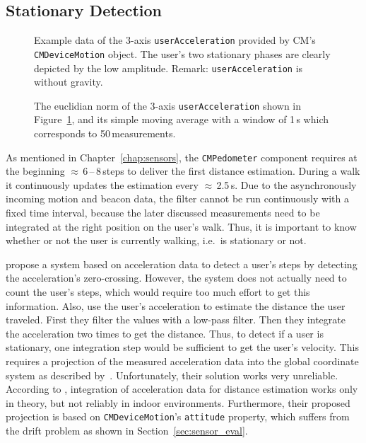 \subsection{Stationary Detection}\label{sec:algo_stationary}

\begin{figure}
	
	\caption{Example data of the 3-axis \texttt{userAcceleration} provided by \acs{CM}'s \texttt{CMDeviceMotion} object. The user's two stationary phases are clearly depicted by the low amplitude. Remark: \texttt{userAcceleration} is without gravity.}
	\label{fig:mm_stationary_1}
\end{figure}

\begin{figure}
	
	\caption{The euclidian norm of the 3-axis \texttt{userAcceleration} shown in Figure~\ref{fig:mm_stationary_1}, and its simple moving average with a window of 1\,s which corresponds to 50\,measurements.}
	\label{fig:mm_stationary_2}
\end{figure}

As mentioned in Chapter~\ref{chap:sensors}, the \texttt{CMPedometer} component requires at the beginning $\approx$\,6\,--\,8\,steps to deliver the first distance estimation. During a walk it continuously updates the estimation every $\approx$\,2.5\,s. Due to the asynchronously incoming motion and beacon data, the filter cannot be run continuously with a fixed time interval, because the later discussed measurements need to be integrated at the right position on the user's walk. Thus, it is important to know whether or not the user is currently walking, i.e.\ is stationary or not.

\citet{wang:wlan} propose a system based on acceleration data to detect a user's steps by detecting the acceleration's zero-crossing. However, the system does not actually need to count the user's steps, which would require too much effort to get this information. Also, \citet{shanklin:embedded_sensors} use the user's acceleration to estimate the distance the user traveled. First they filter the values with a low-pass filter. Then they integrate the acceleration two times to get the distance. Thus, to detect if a user is stationary, one integration step would be sufficient to get the user's velocity. This requires a projection of the measured acceleration data into the global coordinate system as described by~\citet{shanklin:embedded_sensors}. Unfortunately, their solution works very unreliable. According to \citet{wang:wlan}, integration of acceleration data for distance estimation works only in theory, but not reliably in indoor environments. Furthermore, their proposed projection is based on \texttt{CMDeviceMotion}'s \texttt{attitude} property, which suffers from the drift problem as shown in Section~\ref{sec:sensor_eval}.

